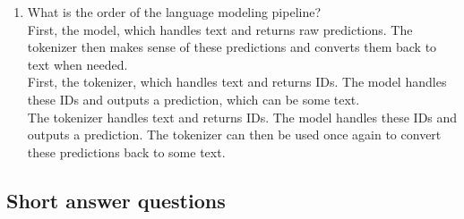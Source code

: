 \begin{enumerate}
    \item What is the order of the language modeling pipeline? \\ 
        \hspace{1cm}\choice{} First, the model, which handles text and returns raw predictions. The tokenizer then makes sense of these predictions and converts them back to text when needed.  \\ 
        \hspace{1cm}\choice{} First, the tokenizer, which handles text and returns IDs. The model handles these IDs and outputs a prediction, which can be some text. \\ 
        \hspace{1cm}\checkmark The tokenizer handles text and returns IDs. The model handles these IDs and outputs a prediction. The tokenizer can then be used once again to convert these predictions back to some text. \\ 
        \solution{}

\end{enumerate}

\subsection{Short answer questions}

